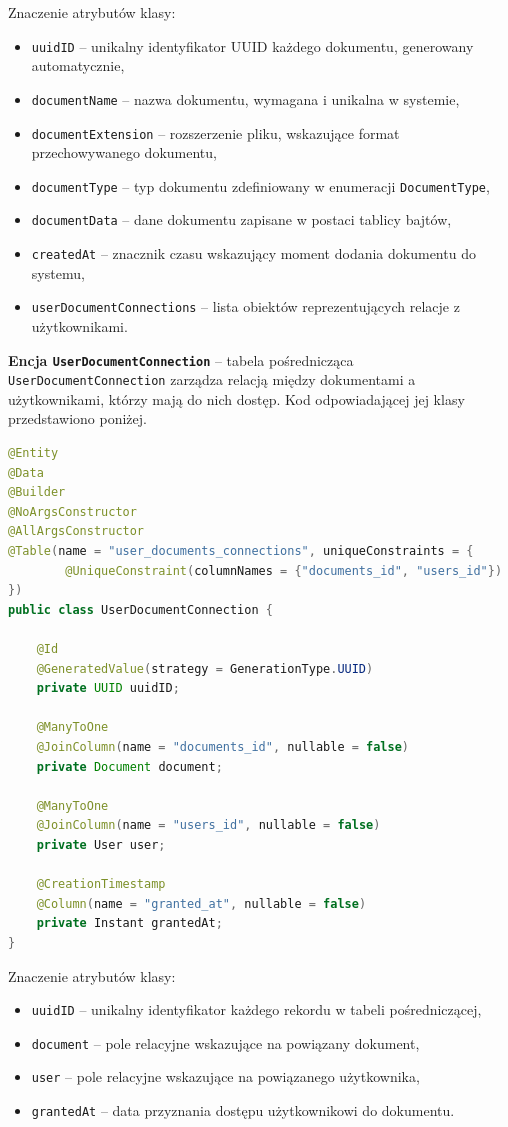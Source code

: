 \noindent Znaczenie atrybutów klasy:
\begin{itemize}
    \item \texttt{uuidID} -- unikalny identyfikator UUID każdego dokumentu, generowany automatycznie,
    \item \texttt{documentName} -- nazwa dokumentu, wymagana i unikalna w systemie,
    \item \texttt{documentExtension} -- rozszerzenie pliku, wskazujące format przechowywanego dokumentu,
    \item \texttt{documentType} -- typ dokumentu zdefiniowany w enumeracji \texttt{DocumentType},
    \item \texttt{documentData} -- dane dokumentu zapisane w postaci tablicy bajtów,
    \item \texttt{createdAt} -- znacznik czasu wskazujący moment dodania dokumentu do systemu,
    \item \texttt{userDocumentConnections} -- lista obiektów reprezentujących relacje z użytkownikami.
\end{itemize}

\textbf{Encja \texttt{UserDocumentConnection}} -- tabela pośrednicząca \texttt{UserDocumentConnection} zarządza relacją między dokumentami a użytkownikami, którzy mają do nich dostęp. Kod odpowiadającej jej klasy przedstawiono poniżej.
\begin{lstlisting}[language=Java, style=JavaStyle, caption=Encja \texttt{UserDocumentConnection}]
@Entity
@Data
@Builder
@NoArgsConstructor
@AllArgsConstructor
@Table(name = "user_documents_connections", uniqueConstraints = {
        @UniqueConstraint(columnNames = {"documents_id", "users_id"})
})
public class UserDocumentConnection {

    @Id
    @GeneratedValue(strategy = GenerationType.UUID)
    private UUID uuidID;

    @ManyToOne
    @JoinColumn(name = "documents_id", nullable = false)
    private Document document;

    @ManyToOne
    @JoinColumn(name = "users_id", nullable = false)
    private User user;

    @CreationTimestamp
    @Column(name = "granted_at", nullable = false)
    private Instant grantedAt;
}
\end{lstlisting}

\noindent Znaczenie atrybutów klasy:
\begin{itemize}
    \item \texttt{uuidID} -- unikalny identyfikator każdego rekordu w tabeli pośredniczącej,
    \item \texttt{document} -- pole relacyjne wskazujące na powiązany dokument,
    \item \texttt{user} -- pole relacyjne wskazujące na powiązanego użytkownika,
    \item \texttt{grantedAt} -- data przyznania dostępu użytkownikowi do dokumentu.
\end{itemize}

